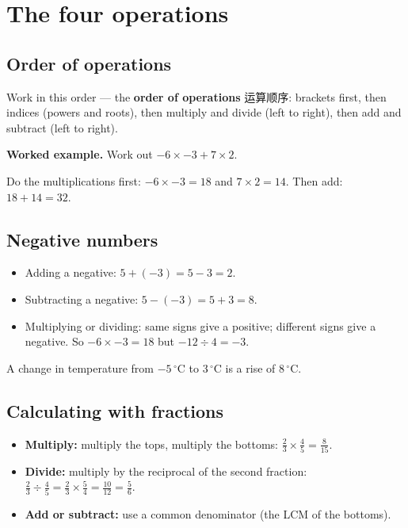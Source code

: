 \documentclass[11pt]{article}
\begin{document}
\section*{The four operations}

\subsection*{Order of operations}

Work in this order — the \textbf{order of operations} 运算顺序: brackets first, then indices (powers and roots), then multiply and divide (left to right), then add and subtract (left to right).

\textbf{Worked example.} Work out $-6 \times -3 + 7 \times 2$.

Do the multiplications first: $-6 \times -3 = 18$ and $7 \times 2 = 14$. Then add: $18 + 14 = 32$.

\subsection*{Negative numbers}

\begin{itemize}
\item Adding a negative: $5 + (-3) = 5 - 3 = 2$.

\item Subtracting a negative: $5 - (-3) = 5 + 3 = 8$.

\item Multiplying or dividing: same signs give a positive; different signs give a negative. So $-6 \times -3 = 18$ but $-12 \div 4 = -3$.

\end{itemize}

A change in temperature from $-5\,^{\circ}\text{C}$ to $3\,^{\circ}\text{C}$ is a rise of $8\,^{\circ}\text{C}$.

\subsection*{Calculating with fractions}

\begin{itemize}
\item \textbf{Multiply:} multiply the tops, multiply the bottoms: $\frac{2}{3} \times \frac{4}{5} = \frac{8}{15}$.

\item \textbf{Divide:} multiply by the reciprocal of the second fraction: $\frac{2}{3} \div \frac{4}{5} = \frac{2}{3} \times \frac{5}{4} = \frac{10}{12} = \frac{5}{6}$.

\item \textbf{Add or subtract:} use a common denominator (the LCM of the bottoms).

\end{itemize}
\end{document}
